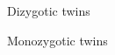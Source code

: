 

\begin{description}[CABR]
\item[DZ] {Dizygotic twins}
\item[MZ] {Monozygotic twins}
\end{description}
